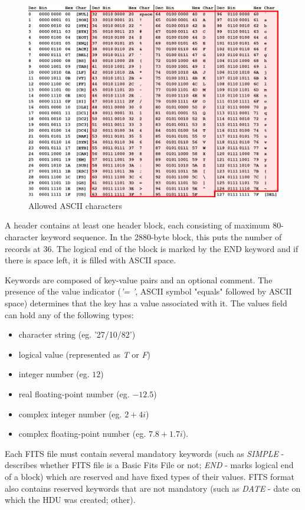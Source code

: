 	\begin{figure}[H]
	\centering
	  \includegraphics[scale=0.2]{images/asciifull}
		  \caption{Allowed ASCII characters}
	  \label{fig:allowed_ascii}
	\end{figure}
	
	A header contains at least one header block, each consisting of maximum 80-character keyword sequence. In the 2880-byte block, this puts the number of records at 36. The logical end of the block is marked by the END keyword and if there is space left, it is filled with ASCII space.
	
	Keywords are composed of key-value pairs and an optional comment. The presence of the value indicator (\emph{'= '}, ASCII symbol "equals" followed by ASCII space) determines that the key has a value associated with it. The values field can hold any of the following types:
	
	\begin{itemize}
		\item character string (eg. '27/10/82')
		\item logical value (represented as \emph{T} or \emph{F})
		\item integer number (eg. $12$)
		\item real floating-point number (eg. $-12.5$)
		\item complex integer number (eg. $2+4i$)
		\item complex floating-point number (eg. $7.8+1.7i$).
	\end{itemize}
	
	 Each FITS file must contain several mandatory keywords (such as \emph{SIMPLE} - describes whether FITS file is a Basic Fits File or not; \emph{END} - marks logical end of a block) which are reserved and have fixed types of their values. FITS format also contains reserved keywords that are not mandatory (such as \emph{DATE} - date on which the HDU was created; other).
	 
